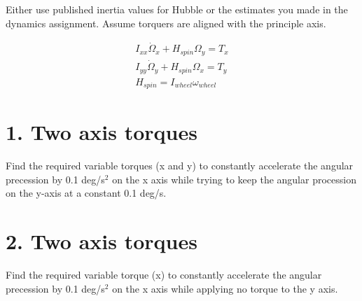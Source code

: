\documentclass[onecolumn,10pt]{jhwhw}
\begin{document}
Either use published inertia values for Hubble or the estimates you made in the dynamics assignment. Assume torquers are aligned with the principle axis.

\begin{align*}
I_{xx}\dot{\Omega}_{x} + H_{spin}\Omega_y = T_x \\
I_{yy}\dot{\Omega}_{y} + H_{spin}\Omega_x = T_y \\
H_{spin} = I_{wheel} \omega_{wheel}
\end{align*}

\part{1. Two axis torques}
Find the required variable torques (x and y) to constantly accelerate the angular precession by 0.1 deg/s$^2$ on the x axis while trying to keep the angular procession on the y-axis at a constant 0.1 deg/s.

\part{2. Two axis torques}
Find the required variable torque (x) to constantly accelerate the angular precession by 0.1 deg/s$^2$ on the x axis while applying no torque to the y axis.
\end{document}
